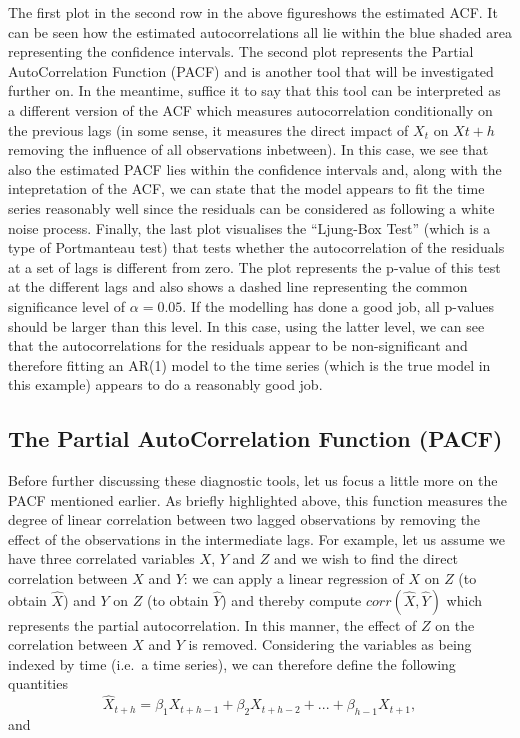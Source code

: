 \documentclass[]{book}
\theoremstyle{definition}
\theoremstyle{definition}
\theoremstyle{definition}
\theoremstyle{remark}
\begin{document}
The first plot in the second row in the above figureshows the estimated
ACF. It can be seen how the estimated autocorrelations all lie within
the blue shaded area representing the confidence intervals. The second
plot represents the Partial AutoCorrelation Function (PACF) and is
another tool that will be investigated further on. In the meantime,
suffice it to say that this tool can be interpreted as a different
version of the ACF which measures autocorrelation conditionally on the
previous lags (in some sense, it measures the direct impact of \(X_t\)
on \(X{t+h}\) removing the influence of all observations inbetween). In
this case, we see that also the estimated PACF lies within the
confidence intervals and, along with the intepretation of the ACF, we
can state that the model appears to fit the time series reasonably well
since the residuals can be considered as following a white noise
process. Finally, the last plot visualises the ``Ljung-Box Test'' (which
is a type of Portmanteau test) that tests whether the autocorrelation of
the residuals at a set of lags is different from zero. The plot
represents the p-value of this test at the different lags and also shows
a dashed line representing the common significance level of
\(\alpha = 0.05\). If the modelling has done a good job, all p-values
should be larger than this level. In this case, using the latter level,
we can see that the autocorrelations for the residuals appear to be
non-significant and therefore fitting an AR(1) model to the time series
(which is the true model in this example) appears to do a reasonably
good job.

\hypertarget{the-partial-autocorrelation-function-pacf}{%
\subsection{The Partial AutoCorrelation Function
(PACF)}\label{the-partial-autocorrelation-function-pacf}}

Before further discussing these diagnostic tools, let us focus a little
more on the PACF mentioned earlier. As briefly highlighted above, this
function measures the degree of linear correlation between two lagged
observations by removing the effect of the observations in the
intermediate lags. For example, let us assume we have three correlated
variables \(X\), \(Y\) and \(Z\) and we wish to find the direct
correlation between \(X\) and \(Y\): we can apply a linear regression of
\(X\) on \(Z\) (to obtain \(\hat{X}\)) and \(Y\) on \(Z\) (to obtain
\(\hat{Y}\)) and thereby compute \(corr(\hat{X}, \hat{Y})\) which
represents the partial autocorrelation. In this manner, the effect of
\(Z\) on the correlation between \(X\) and \(Y\) is removed. Considering
the variables as being indexed by time (i.e.~a time series), we can
therefore define the following quantities
\[\hat{X}_{t+h} = \beta_1 X_{t+h-1} + \beta_2 X_{t+h-2} + ... + \beta_{h-1} X_{t+1},\]
and
\end{document}
